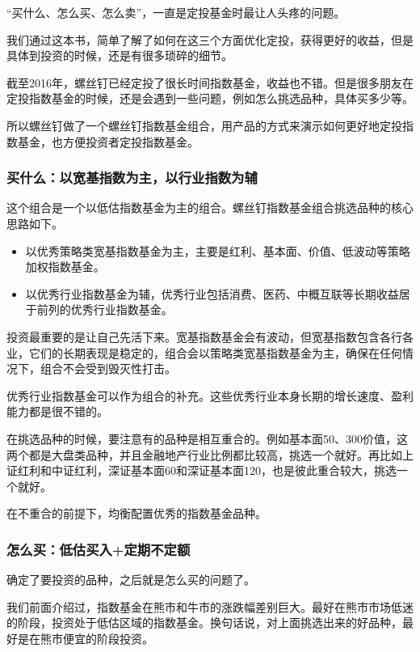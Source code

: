 “买什么、怎么买、怎么卖”，一直是定投基金时最让人头疼的问题。

我们通过这本书，简单了解了如何在这三个方面优化定投，获得更好的收益，但是具体到投资的时候，还是有很多琐碎的细节。

截至2016年，螺丝钉已经定投了很长时间指数基金，收益也不错。但是很多朋友在定投指数基金的时候，还是会遇到一些问题，例如怎么挑选品种，具体买多少等。

所以螺丝钉做了一个螺丝钉指数基金组合，用产品的方式来演示如何更好地定投指数基金，也方便投资者定投指数基金。

\subsubsection{买什么：以宽基指数为主，以行业指数为辅}

这个组合是一个以低估指数基金为主的组合。螺丝钉指数基金组合挑选品种的核心思路如下。

\begin{itemize}
\item 以优秀策略类宽基指数基金为主，主要是红利、基本面、价值、低波动等策略加权指数基金。
\item 以优秀行业指数基金为辅，优秀行业包括消费、医药、中概互联等长期收益居于前列的优秀行业指数基金。
\end{itemize}

投资最重要的是让自己先活下来。宽基指数基金会有波动，但宽基指数包含各行各业，它们的长期表现是稳定的，组合会以策略类宽基指数基金为主，确保在任何情况下，组合不会受到毁灭性打击。

优秀行业指数基金可以作为组合的补充。这些优秀行业本身长期的增长速度、盈利能力都是很不错的。

在挑选品种的时候，要注意有的品种是相互重合的。例如基本面50、300价值，这两个都是大盘类品种，并且金融地产行业比例都比较高，挑选一个就好。再比如上证红利和中证红利，深证基本面60和深证基本面120，也是彼此重合较大，挑选一个就好。

在不重合的前提下，均衡配置优秀的指数基金品种。

\subsubsection{怎么买：低估买入+定期不定额}

确定了要投资的品种，之后就是怎么买的问题了。

我们前面介绍过，指数基金在熊市和牛市的涨跌幅差别巨大。最好在熊市市场低迷的阶段，投资处于低估区域的指数基金。换句话说，对上面挑选出来的好品种，最好是在熊市便宜的阶段投资。

